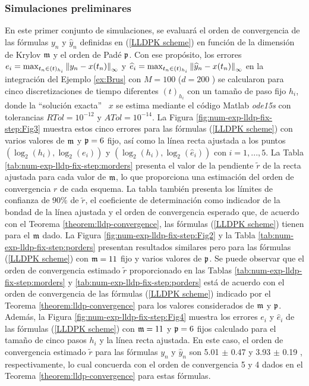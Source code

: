 \subsubsection{Simulaciones preliminares}
En este primer conjunto de simulaciones, se evaluará el orden de convergencia de las fórmulas $y_n$ y $\widehat{y}_n$ definidas en (\ref{LLDPK scheme}) en función de la dimensión de Krylov $\mathfrak{m}$ y el orden de Padé $\mathfrak{p}$. Con ese propósito, los errores $e_i=\max_{t_n\in(t)_{h_i}}\left\lVert y_n-x(t_n) \right\rVert_\infty$ y $\widehat{e}_i=\max_{t_n\in(t )_{h_i}}\left\lVert \widehat{y}_n-x(t_n) \right\rVert_\infty$ en la integración del Ejemplo \ref{ex:Brus} con $M=100$ ($d=200$ ) se calcularon para cinco discretizaciones de tiempo diferentes $(t)_{h_i}$ con un tamaño de paso fijo $h_i$, donde la \textquotedblleft solución exacta\textquotedblright~ $x$ se estima mediante el código Matlab \textit{ode15s} con tolerancias $RTol=10^{ -12}$ y $ATol=10^{-14}$. La Figura \ref{fig:num-exp-lldp-fix-step:Fig3} muestra estos cinco errores para las fórmulas (\ref{LLDPK scheme}) con varios valores de $\mathfrak{m}$ y $\mathfrak{p}=6$ fijo, así como la línea recta ajustada a los puntos $(\log_2( h_i),\log_2(e_i))$ y $(\log_2(h_i),\log_2(\widehat{e}_i))$ con $i=1,...,5$. La Tabla \ref{tab:num-exp-lldp-fix-step:morders} presenta el valor de la pendiente $\widetilde{r}$ de la recta ajustada para cada valor de $\mathfrak{m}$, lo que proporciona una estimación del orden de convergencia $r$ de cada esquema. La tabla también presenta los límites de confianza de $90\%$ de $\widetilde{r}$, el coeficiente de determinación como indicador de la bondad de la línea ajustada y el orden de convergencia esperado que, de acuerdo con el Teorema \ref{theorem:lldp-convergence}, las fórmulas (\ref{LLDPK scheme}) tienen para el $\mathfrak{m}$ dado. La Figura \ref{fig:num-exp-lldp-fix-step:Fig2} y la Tabla \ref{tab:num-exp-lldp-fix-step:porders} presentan resultados similares pero para las fórmulas (\ref{LLDPK scheme}) con $\mathfrak{m}=11$ fijo y varios valores de $\mathfrak{p}$. Se puede observar que el orden de convergencia estimado $\widetilde{r}$ proporcionado en las Tablas \ref{tab:num-exp-lldp-fix-step:morders} y \ref{tab:num-exp-lldp-fix-step:porders} está de acuerdo con el orden de convergencia de las fórmulas (\ref{LLDPK scheme}) indicado por el Teorema \ref{theorem:lldp-convergence} para los valores considerados de $\mathfrak{m}$ y $\mathfrak{p}$. Además, la Figura \ref{fig:num-exp-lldp-fix-step:Fig4} muestra los errores $e_i$ y $\widehat{e}_i$ de las fórmulas (\ref{LLDPK scheme}) con $\mathfrak{m}=11$ y $\mathfrak{p}=6$ fijos calculado para el tamaño de cinco pasos $h_i$ y la línea recta ajustada. En este caso, el orden de convergencia estimado $\widetilde{r}$ para las fórmulas $y_n$ y $\widehat{y}_n$ son 5.01 $\pm$ 0.47 y 3.93 $\pm$ 0.19 , respectivamente, lo cual concuerda con el orden de convergencia 5 y 4 dados en el Teorema \ref{theorem:lldp-convergence} para estas fórmulas.

